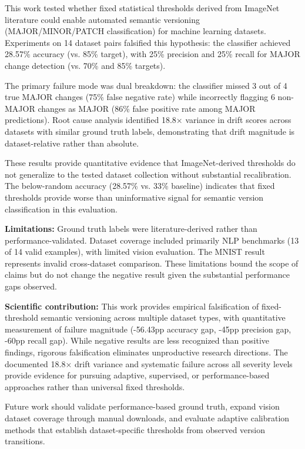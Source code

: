 
This work tested whether fixed statistical thresholds derived from ImageNet literature could enable automated semantic versioning (MAJOR/MINOR/PATCH classification) for machine learning datasets. Experiments on 14 dataset pairs falsified this hypothesis: the classifier achieved 28.57\% accuracy (vs. 85\% target), with 25\% precision and 25\% recall for MAJOR change detection (vs. 70\% and 85\% targets).

The primary failure mode was dual breakdown: the classifier missed 3 out of 4 true MAJOR changes (75\% false negative rate) while incorrectly flagging 6 non-MAJOR changes as MAJOR (86\% false positive rate among MAJOR predictions). Root cause analysis identified 18.8× variance in drift scores across datasets with similar ground truth labels, demonstrating that drift magnitude is dataset-relative rather than absolute.

These results provide quantitative evidence that ImageNet-derived thresholds do not generalize to the tested dataset collection without substantial recalibration. The below-random accuracy (28.57\% vs. 33\% baseline) indicates that fixed thresholds provide worse than uninformative signal for semantic version classification in this evaluation.

\textbf{Limitations:} Ground truth labels were literature-derived rather than performance-validated. Dataset coverage included primarily NLP benchmarks (13 of 14 valid examples), with limited vision evaluation. The MNIST result represents invalid cross-dataset comparison. These limitations bound the scope of claims but do not change the negative result given the substantial performance gaps observed.

\textbf{Scientific contribution:} This work provides empirical falsification of fixed-threshold semantic versioning across multiple dataset types, with quantitative measurement of failure magnitude (-56.43pp accuracy gap, -45pp precision gap, -60pp recall gap). While negative results are less recognized than positive findings, rigorous falsification eliminates unproductive research directions. The documented 18.8× drift variance and systematic failure across all severity levels provide evidence for pursuing adaptive, supervised, or performance-based approaches rather than universal fixed thresholds.

Future work should validate performance-based ground truth, expand vision dataset coverage through manual downloads, and evaluate adaptive calibration methods that establish dataset-specific thresholds from observed version transitions.
